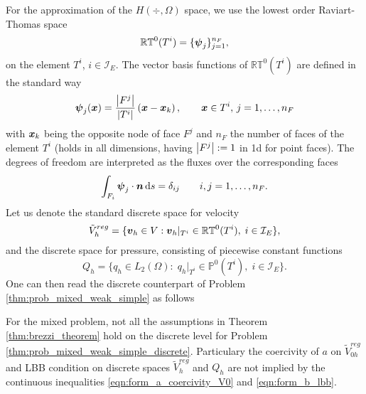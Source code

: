 For the approximation of the $H(\div,\Omega)$ space, we use the lowest order Raviart-Thomas space
\begin{equation}
    \mathbb{RT}^0(T^i) = \{\mathbf{\boldsymbol{\psi}}_j\}_{j=1}^{n_F}, 
\end{equation}
on the element $T^i$, $i\in\mathcal{I}_E$. The vector basis functions of $\mathbb{RT}^0(T^i)$
are defined in the standard way
\begin{equation}
    \mathbf{\boldsymbol{\psi}}_j(\mathbf{\boldsymbol{x}}) = \frac{\left|F^j\right|}{\left|T^i\right|} \left( \mathbf{\boldsymbol{x}} - \mathbf{\boldsymbol{x}}_k \right), \qquad \mathbf{\boldsymbol{x}}\in T^i,\, j=1,\ldots,n_F
\end{equation}
with $\mathbf{\boldsymbol{x}}_k$ being the opposite node of face $F^j$ and $n_F$ the number of faces of the element $T^i$
(holds in all dimensions, having $\left|F^j\right|:=1$ in 1d for point faces).
The degrees of freedom are interpreted as the fluxes over the corresponding faces
\begin{equation}
    \int_{F_i} \mathbf{\boldsymbol{\psi}}_j \cdot \mathbf{\boldsymbol{n}} \,{\rm d} s = \delta_{ij} \qquad i,j=1,\ldots,n_F.
\end{equation}
Let us denote the standard discrete space for velocity
\begin{equation}
    \tilde V_h^{reg} = \{\mathbf{\boldsymbol{v}}_h\in V: \mathbf{\boldsymbol{v}}_h|_{T^i} \in \mathbb{RT}^0(T^i),\; i\in\mathcal{I}_E \},
\end{equation}
and the discrete space for pressure, consisting of piecewise constant functions
\begin{equation}
    Q_h=\{q_h\in L_2(\Omega):\; q_h|_{T^i}\in \mathbb{P}^0(T^i),\; i\in\mathcal{I}_E\}.
\end{equation}
One can then read the discrete counterpart of Problem \ref{thm:prob_mixed_weak_simple} as follows

For the mixed problem, not all the assumptions in Theorem \ref{thm:brezzi_theorem}
hold on the discrete level for Problem \ref{thm:prob_mixed_weak_simple_discrete}.
Particulary the coercivity of $a$ on $\tilde V_{0h}^{reg}$
and LBB condition on discrete spaces $\tilde V_h^{reg}$ and $Q_h$ are not implied by the continuous inequalities
\eqref{eqn:form_a_coercivity_V0} and \eqref{eqn:form_b_lbb}.


